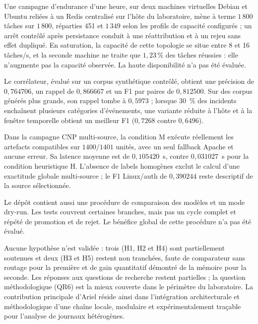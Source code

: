 Une campagne d'endurance d'une heure, sur deux machines virtuelles Debian et
Ubuntu reliées à un Redis centralisé sur l'hôte du laboratoire, mène à terme
$1\,800$ tâches sur $1\,800$, réparties 451 et $1\,349$ selon les profils de
capacité configurés ; un arrêt contrôlé après persistance conduit à une
réattribution et à un rejeu sans effet dupliqué. En saturation, la capacité
de cette topologie se situe entre 8 et 16 tâches/s, et la seconde machine ne
traite que $1{,}23\,\%$ des tâches réussies : elle n'augmente pas la capacité
observée. La haute disponibilité n'a pas été évaluée.

Le corrélateur, évalué sur un corpus synthétique contrôlé, obtient une
précision de $0{,}764706$, un rappel de $0{,}866667$ et un F1 par paires de
$0{,}812500$. Sur des corpus générés plus grands, son rappel tombe à
$0{,}5973$ ; lorsque 30~\% des incidents enchaînent plusieurs catégories
d'événements, une variante réduite à l'hôte et à la fenêtre temporelle obtient
un meilleur F1 ($0{,}7268$ contre $0{,}6496$).

Dans la campagne CNP multi-source, la condition M exécute réellement les
artefacts compatibles sur $1400/1401$ unités, avec un seul fallback Apache et
aucune erreur. Sa latence moyenne est de $0{,}105420$~s, contre $0{,}031027$~s
pour la condition heuristique H. L'absence de labels homogènes exclut le
calcul d'une exactitude globale multi-source ; le F1 Linux/auth de
$0{,}390244$ reste descriptif de la source sélectionnée.

Le dépôt contient aussi une procédure de comparaison des modèles et un mode
dry-run. Les tests couvrent certaines branches, mais pas un cycle complet et
répété de promotion et de rejet. Le bénéfice global de cette procédure n'a pas
été évalué.

Aucune hypothèse n'est validée : trois (H1, H2 et H4) sont partiellement
soutenues et deux (H3 et H5) restent non tranchées, faute de comparateur sans
routage pour la première et de gain quantitatif démontré de la mémoire pour la
seconde. Les réponses aux questions de recherche restent partielles ; la
question méthodologique (QR6) est la mieux couverte dans le périmètre du
laboratoire. La contribution principale d'Ariel \logminer{} réside ainsi dans
l'intégration architecturale et méthodologique d'une chaîne locale, modulaire
et expérimentalement traçable pour l'analyse de journaux hétérogènes.
